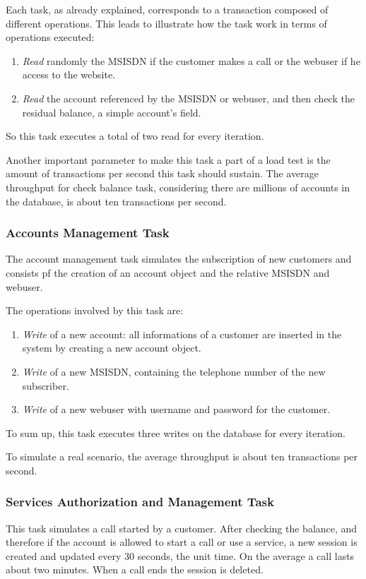 Each task, as already explained, corresponds to a transaction composed of different operations. This leads to illustrate how the task work in terms of operations executed:
\begin{enumerate}
	\item \emph{Read} randomly the MSISDN if the customer makes a call or the webuser if he access to the website.
	\item \emph{Read} the account referenced by the MSISDN or webuser, and then check the residual balance, a simple account's field.
\end{enumerate}
So this task executes a total of two read for every iteration.

Another important parameter to make this task a part of a load test is the amount of transactions per second this task should sustain. The average throughput for check balance task, considering there are millions of accounts in the database, is about ten transactions per second.

			\subsubsection{Accounts Management Task}
The account management task simulates the subscription of new customers and consists pf the creation of an account object and the relative MSISDN and webuser.

The operations involved by this task are:
\begin{enumerate}
	\item \emph{Write} of a new account: all informations of a customer are inserted in the system by creating a new account object.
	\item \emph{Write} of a new MSISDN, containing the telephone number of the new subscriber.
	\item \emph{Write} of a new webuser with username and password for the customer.
\end{enumerate}
To sum up, this task executes three writes on the database for every iteration.

To simulate a real scenario, the average throughput is about ten transactions per second.

			\subsubsection{Services Authorization and Management Task}
This task simulates a call started by a customer. After checking the balance, and therefore if the account is allowed to start a call or use a service, a new session is created and updated every 30 seconds, the unit time. On the average a call lasts about two minutes. When a call ends the session is deleted.

